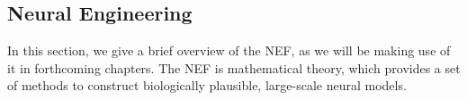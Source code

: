 \subsection{Neural Engineering}
\label{subsec:neural_eng}
In this section, we give a brief overview of the \acf{NEF}, as we will be making use of it in forthcoming chapters.
The \ac{NEF} \cite{Eliasmith2003} is mathematical theory, which provides a set of methods to construct biologically plausible, large-scale neural models.


%
%
%
%
